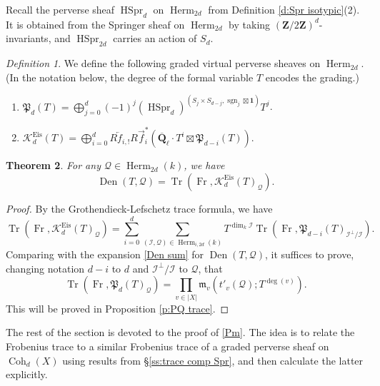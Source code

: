 \documentclass[reqno]{amsart}
\numberwithin{equation}{section}
\newcommand{\Q}{\mathbf{Q}}
\newcommand{\Z}{\mathbf{Z}}
\newcommand{\sgn}{\operatorname{sgn}}
\DeclareMathOperator{\Frob}{Fr}
\DeclareMathOperator{\Tr}{Tr}
\DeclareMathOperator{\Eis}{Eis}
\DeclareMathOperator{\Herm}{Herm}
\DeclareMathOperator{\Coh}{Coh}
\DeclareMathOperator{\Den}{Den}
\DeclareMathOperator{\HSpr}{HSpr}
\newcommand{\bt}{\boxtimes}
\newcommand{\Qlbar}{\overline{\Q}_\ell}
\newcommand\one{\mathbf{1}}
\newcommand{\oll}[1]{\overleftarrow{#1}}
\newcommand{\orr}[1]{\overrightarrow{#1}}
\newcommand\cI{\mathcal{I}}
\newcommand\cK{\mathcal{K}}
\newcommand\cQ{\mathcal{Q}}
\newcommand\frP{\mathfrak{P}}
\newcommand\fm{\mathfrak{m}}
\newtheorem{thm}{Theorem}[section]
\theoremstyle{remark}
\newtheorem{defn}[thm]{Definition}
\numberwithin{equation}{section}
\begin{document}
Recall the perverse sheaf $\HSpr_{d}$ on $\Herm_{2d}$ from Definition \ref{d:Spr isotypic}(2). It is obtained from the Springer sheaf on $\Herm_{2d}$ by taking $(\Z/2\Z)^{d}$-invariants, and $\HSpr_{2d}$ carries an action of $S_{d}$.

\begin{defn}\label{def: K_Eis} We define the following graded virtual perverse sheaves on $\Herm_{2d}$. (In the notation below, the degree of the formal variable $T$ encodes the grading.) 
\begin{enumerate}
\item $\frP_{d}(T)=\bigoplus_{j=0}^{d}(-1)^{j}(\HSpr_{d})^{(S_{j}\times S_{d-j}, \sgn_{j}\bt \one)}T^{j}$.
\item $\cK^{\Eis}_{d}(T)=\bigoplus_{i=0}^{d} R\oll{f}_{i,!}R\orr{f}^{*}_{i}(\Qlbar\cdot T^{i}\bt \frP_{d-i}(T)).$
\end{enumerate}
\end{defn}


\begin{thm}\label{th:Den Wd} For any $\cQ\in \Herm_{2d}(k)$, we have
\begin{equation*}
\Den(T,\cQ)=\Tr(\Frob, \cK^{\Eis}_{d}(T)_{\cQ}).
\end{equation*}
\end{thm}
\begin{proof}
By the Grothendieck-Lefschetz trace formula, we have
\begin{equation*}
\Tr(\Frob, \cK^{\Eis}_{d}(T)_{\cQ})= \sum_{i=0}^d \sum_{(\cI,\cQ)\in \Herm_{i,2d}(k)}T^{\dim_{k}\cI}\Tr(\Frob, \frP_{d-i}(T)_{\cI^{\bot}/\cI}).
\end{equation*}
Comparing with the expansion \eqref{Den sum} for $\Den(T,\cQ)$, it suffices to prove, changing notation $d-i$ to $d$ and $\cI^{\bot}/\cI$ to $\cQ$, that
\begin{equation}\label{Pm}
\Tr(\Frob, \frP_{d}(T)_{\cQ})=\prod_{v\in |X|}\fm_{v}(t'_{v}(\cQ);T^{\deg(v)}).
\end{equation}
This will be proved in Proposition \ref{p:PQ trace}.
\end{proof}

The rest of the section is devoted to the proof of \eqref{Pm}. The idea is to relate the Frobenius trace to a similar Frobenius trace of a graded perverse sheaf on $\Coh_{d}(X)$ using results from \S\ref{ss:trace comp Spr}, and then calculate the latter explicitly.


\end{document}
